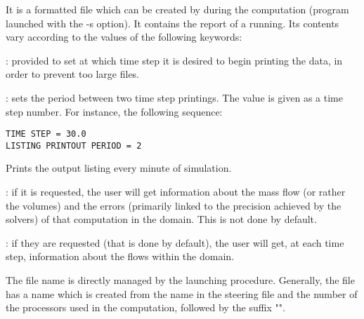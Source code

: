 It is a formatted file which can be created by  during the
computation (program launched with the -s option). It contains the report of a
 running. Its contents vary according to the values of the following
keywords:

: provided to set at
which time step it is desired to begin printing the data, in order to prevent
too large files.

: sets the period between two time step
printings. The value is given as a time step number. For instance, the
following sequence:

\begin{lstlisting}[language=TelemacCas]
TIME STEP = 30.0
LISTING PRINTOUT PERIOD = 2
\end{lstlisting}

Prints the output listing every minute of simulation.

: if it is requested, the user will get
information about the mass flow (or rather the volumes) and the errors
(primarily linked to the precision achieved by the solvers) of that computation
in the domain. This is not done by default.

: if they are
requested (that is done by default), the user will get, at each time step,
information about the flows within the domain.

The file name is directly managed by the  launching procedure.
Generally, the file has a name which is created from the name in the steering
file and the number of the processors used in the computation, followed by the
suffix "".

%
%
%
